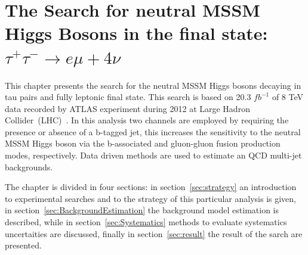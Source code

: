 \chapter[Neutral MSSM Higgs Search...]{The Search for neutral MSSM Higgs Bosons in the final state:
$\tau^{+}\tau^{-} \rightarrow e \mu + 4\nu$}

%
%

This chapter presents the search for the neutral MSSM Higgs bosons decaying in tau pairs
and fully leptonic final state. This search is based on 20.3 $fb^{-1}$ of 8 TeV data 
recorded by ATLAS experiment during 2012 at Large Hadron Collider~(LHC)~\cite{LHC}.
In this analysis two channels are employed by requiring the
presence or absence of a b-tagged jet, this increases the 
sensitivity to the neutral MSSM Higgs boson via
the b-associated and gluon-gluon fusion production modes,
respectively. Data driven methods are used to estimate \Ztautau an QCD multi-jet backgrounds.

The chapter is divided in four sections: in section~\ref{sec:strategy} an introduction to experimental searches and to the strategy
of this particular analysis is given, in section~\ref{sec:BackgroundEstimation} the background model estimation is described, 
while in section~\ref{sec:Systematics} methods to evaluate systematics uncertaities are discussed, finally 
in section~\ref{sec:result} the result of the sarch are presented.


